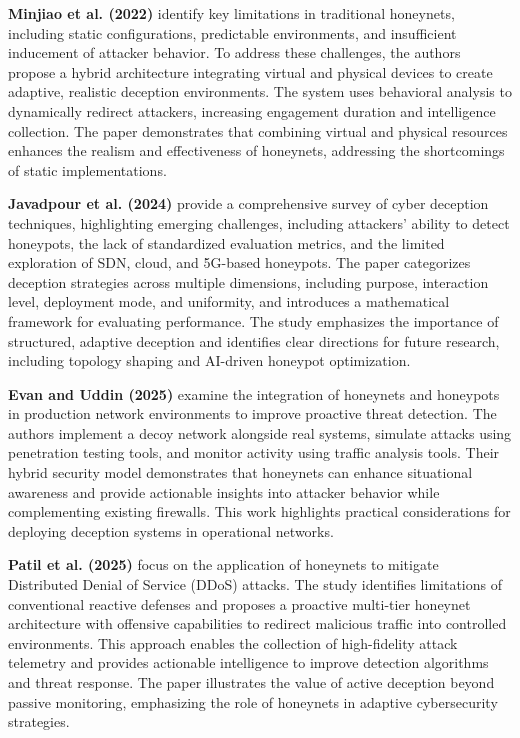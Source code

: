 \documentclass[12pt]{article}
\begin{document}
\textbf{Minjiao et al. (2022)} identify key limitations in traditional honeynets, including static configurations, predictable environments, and insufficient inducement of attacker behavior. To address these challenges, the authors propose a hybrid architecture integrating virtual and physical devices to create adaptive, realistic deception environments. The system uses behavioral analysis to dynamically redirect attackers, increasing engagement duration and intelligence collection. The paper demonstrates that combining virtual and physical resources enhances the realism and effectiveness of honeynets, addressing the shortcomings of static implementations. 

\textbf{Javadpour et al. (2024)} provide a comprehensive survey of cyber deception techniques, highlighting emerging challenges, including attackers’ ability to detect honeypots, the lack of standardized evaluation metrics, and the limited exploration of SDN, cloud, and 5G-based honeypots. The paper categorizes deception strategies across multiple dimensions, including purpose, interaction level, deployment mode, and uniformity, and introduces a mathematical framework for evaluating performance. The study emphasizes the importance of structured, adaptive deception and identifies clear directions for future research, including topology shaping and AI-driven honeypot optimization. 

\textbf{Evan and Uddin (2025)} examine the integration of honeynets and honeypots in production network environments to improve proactive threat detection. The authors implement a decoy network alongside real systems, simulate attacks using penetration testing tools, and monitor activity using traffic analysis tools. Their hybrid security model demonstrates that honeynets can enhance situational awareness and provide actionable insights into attacker behavior while complementing existing firewalls. This work highlights practical considerations for deploying deception systems in operational networks. 

\textbf{Patil et al. (2025)} focus on the application of honeynets to mitigate Distributed Denial of Service (DDoS) attacks. The study identifies limitations of conventional reactive defenses and proposes a proactive multi-tier honeynet architecture with offensive capabilities to redirect malicious traffic into controlled environments. This approach enables the collection of high-fidelity attack telemetry and provides actionable intelligence to improve detection algorithms and threat response. The paper illustrates the value of active deception beyond passive monitoring, emphasizing the role of honeynets in adaptive cybersecurity strategies. 
\end{document}

